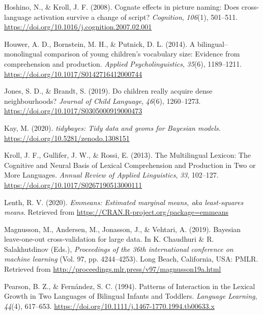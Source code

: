\documentclass[
  english,
  man,man,floatsintext]{apa6}
\newlength{\cslhangindent}
\newenvironment{cslreferences}%
  {\setlength{\parindent}{0pt}%
  \everypar{\setlength{\hangindent}{\cslhangindent}}\ignorespaces}%
  {\par}
\begin{document}
\begin{cslreferences}
\leavevmode\hypertarget{ref-hoshino_cognate_2008}{}%
Hoshino, N., \& Kroll, J. F. (2008). Cognate effects in picture naming: Does cross-language activation survive a change of script? \emph{Cognition}, \emph{106}(1), 501--511. \url{https://doi.org/10.1016/j.cognition.2007.02.001}

\leavevmode\hypertarget{ref-houwer_bilingualmonolingual_2014}{}%
Houwer, A. D., Bornstein, M. H., \& Putnick, D. L. (2014). A bilingual--monolingual comparison of young children's vocabulary size: Evidence from comprehension and production. \emph{Applied Psycholinguistics}, \emph{35}(6), 1189--1211. \url{https://doi.org/10.1017/S0142716412000744}

\leavevmode\hypertarget{ref-jones_children_2019}{}%
Jones, S. D., \& Brandt, S. (2019). Do children really acquire dense neighbourhoods? \emph{Journal of Child Language}, \emph{46}(6), 1260--1273. \url{https://doi.org/10.1017/S0305000919000473}

\leavevmode\hypertarget{ref-kay_tidybayes_2020}{}%
Kay, M. (2020). \emph{tidybayes: Tidy data and geoms for Bayesian models}. \url{https://doi.org/10.5281/zenodo.1308151}

\leavevmode\hypertarget{ref-kroll_multilingual_2013}{}%
Kroll, J. F., Gullifer, J. W., \& Rossi, E. (2013). The Multilingual Lexicon: The Cognitive and Neural Basis of Lexical Comprehension and Production in Two or More Languages. \emph{Annual Review of Applied Linguistics}, \emph{33}, 102--127. \url{https://doi.org/10.1017/S0267190513000111}

\leavevmode\hypertarget{ref-lenth_emmeans_2020}{}%
Lenth, R. V. (2020). \emph{Emmeans: Estimated marginal means, aka least-squares means}. Retrieved from \url{https://CRAN.R-project.org/package=emmeans}

\leavevmode\hypertarget{ref-magnusson_leave_2019}{}%
Magnusson, M., Andersen, M., Jonasson, J., \& Vehtari, A. (2019). Bayesian leave-one-out cross-validation for large data. In K. Chaudhuri \& R. Salakhutdinov (Eds.), \emph{Proceedings of the 36th international conference on machine learning} (Vol. 97, pp. 4244--4253). Long Beach, California, USA: PMLR. Retrieved from \url{http://proceedings.mlr.press/v97/magnusson19a.html}

\leavevmode\hypertarget{ref-pearson_patterns_1994}{}%
Pearson, B. Z., \& Fernández, S. C. (1994). Patterns of Interaction in the Lexical Growth in Two Languages of Bilingual Infants and Toddlers. \emph{Language Learning}, \emph{44}(4), 617--653. \url{https://doi.org/10.1111/j.1467-1770.1994.tb00633.x}


\end{cslreferences}
\end{document}
